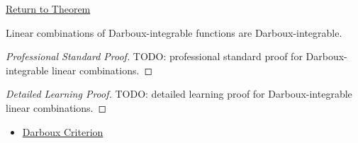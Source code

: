 \newpage
{}
\label{prf:darboux-integrable-linear-combinations}

\begin{remark*}[Return]
\hyperref[thm:darboux-integrable-linear-combinations]{Return to Theorem}
\end{remark*}

\begin{theorem*}
Linear combinations of Darboux-integrable functions are Darboux-integrable.
\end{theorem*}

\begin{proof}[Professional Standard Proof]
\LRAProofBodyStart
TODO: professional standard proof for Darboux-integrable linear combinations.
\end{proof}

\begin{proof}[Detailed Learning Proof]
\LRAProofBodyStart
TODO: detailed learning proof for Darboux-integrable linear combinations.
\end{proof}

\begin{remark*}
\end{remark*}

\begin{dependencies}
\begin{itemize}
  \item \hyperref[thm:darboux-criterion]{Darboux Criterion}
\end{itemize}
\end{dependencies}

\clearpage
